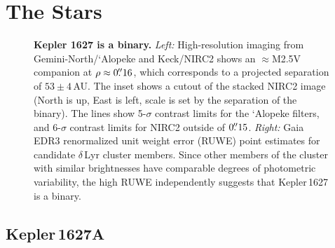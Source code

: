 \documentclass[12pt,modern,twocolumn,tighten,linenumbers]{aastex63}
\begin{document}
\section{The Stars}
\label{sec:stars}

\begin{figure}[tp]
	\begin{center}
		\leavevmode
	\end{center}
	\vspace{-0.5cm}
	\caption{
		{\bf Kepler 1627 is a binary.} {\it Left:} High-resolution imaging
		from Gemini-North/`Alopeke and Keck/NIRC2 shows an $\approx$M2.5V
		companion at $\rho \approx 0\mbox{$.\!\!^{\prime\prime}$}16$, which corresponds to a
		projected separation of $53\pm4$\,AU.  The inset shows a cutout of
		the stacked NIRC2 image (North is up, East is left, scale is set
		by the separation of the binary).  The lines show 5-$\sigma$
		contrast limits for the `Alopeke filters, and 6-$\sigma$ contrast
		limits for NIRC2 outside of $0\mbox{$.\!\!^{\prime\prime}$}15$. {\it Right:} Gaia EDR3
		renormalized unit weight error (RUWE) point estimates for
		candidate $\delta$\,Lyr cluster members.  Since other members of
		the cluster with similar brightnesses have comparable degrees of
		photometric variability, the high RUWE independently suggests that
		Kepler\,1627 is a binary. 
		\label{fig:kep1627binary}
	}
\end{figure}

\subsection{Kepler\,1627A}
\end{document}
